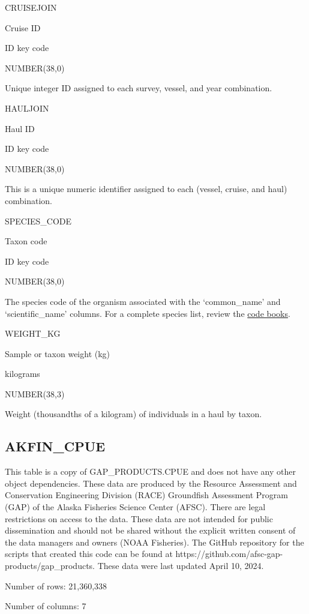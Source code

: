 \documentclass[
  letterpaper,
  oneside,
  open=any]{scrbook}
\begin{document}
CRUISEJOIN

Cruise ID

ID key code

NUMBER(38,0)

Unique integer ID assigned to each survey, vessel, and year combination.

HAULJOIN

Haul ID

ID key code

NUMBER(38,0)

This is a unique numeric identifier assigned to each (vessel, cruise,
and haul) combination.

SPECIES\_CODE

Taxon code

ID key code

NUMBER(38,0)

The species code of the organism associated with the `common\_name' and
`scientific\_name' columns. For a complete species list, review the
\href{https://www.fisheries.noaa.gov/resource/document/groundfish-survey-species-code-manual-and-data-codes-manual}{code
books}.

WEIGHT\_KG

Sample or taxon weight (kg)

kilograms

NUMBER(38,3)

Weight (thousandths of a kilogram) of individuals in a haul by taxon.

\hypertarget{akfin_cpue}{%
\subsection{AKFIN\_CPUE}\label{akfin_cpue}}

This table is a copy of GAP\_PRODUCTS.CPUE and does not have any other
object dependencies. These data are produced by the Resource Assessment
and Conservation Engineering Division (RACE) Groundfish Assessment
Program (GAP) of the Alaska Fisheries Science Center (AFSC). There are
legal restrictions on access to the data. These data are not intended
for public dissemination and should not be shared without the explicit
written consent of the data managers and owners (NOAA Fisheries). The
GitHub repository for the scripts that created this code can be found at
https://github.com/afsc-gap-products/gap\_products. These data were last
updated April 10, 2024.

Number of rows: 21,360,338

Number of columns: 7
\end{document}

